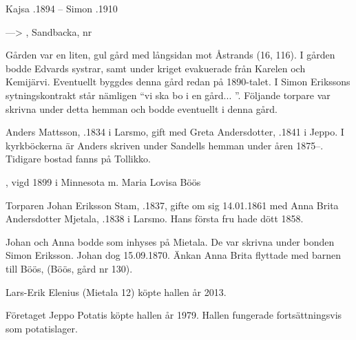 Kajsa .1894  --	Simon .1910


--->	, Sandbacka, nr 

Gården var en liten, gul gård med långsidan mot Åstrands (16, 116).	I gården bodde Edvards systrar, samt under kriget evakuerade från Karelen och Kemijärvi. Eventuellt byggdes denna gård redan på 1890-talet. I Simon Erikssons sytningskontrakt står nämligen ``vi ska bo i en gård... ''. Följande torpare var skrivna under detta hemman och bodde eventuellt i denna gård.


Anders Mattsson, .1834 i Larsmo, gift med Greta Andersdotter, .1841 i Jeppo. I kyrkböckerna är Anders skriven under Sandells hemman under åren 1875--. Tidigare bostad fanns på Tollikko.
\begin{jhchildren}
  \item {}, vigd 1899 i  Minnesota m. Maria Lovisa Böös
  \item {}
\end{jhchildren}


Torparen Johan Eriksson Stam, .1837, gifte om sig 14.01.1861 med Anna Brita Andersdotter Mjetala,  .1838 i Larsmo. Hans första fru hade dött 1858.
\begin{jhchildren}
  \item {}
  \item {}
  \item {}
  \item {}
\end{jhchildren}
Johan och Anna bodde som inhyses på Mietala. De var skrivna under bonden Simon Eriksson. Johan dog 15.09.1870. Änkan Anna Brita flyttade med barnen till Böös, (Böös, gård nr 130).




Lars-Erik Elenius (Mietala 12) köpte hallen år 2013.\jhvspace{}


Företaget Jeppo Potatis köpte hallen år 1979. Hallen fungerade fortsättningsvis som potatislager.\jhvspace{}


